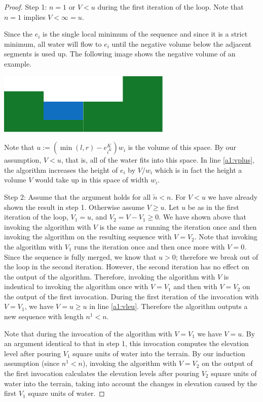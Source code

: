 \documentclass[11pt,a4paper]{article}
\begin{document}
\begin{proof}
Step 1: $n = 1$ or $V < u$ during the first iteration of the loop. Note that $n = 1$ implies $V < \infty = u$.

Since the $e_i$ is the single local minimum of the sequence and since it is a strict minimum, all water will flow to $e_i$ until the negative volume below the adjacent segments is used up.
The following image shows the negative volume of an example.
\begin{center}
  \includegraphics{im6.pdf}
\end{center}
Note that $u := (\min(l, r)-e_{i^K}^K)w_i$ is the volume of this space.
By our assumption, $V < u$, that is, all of the water fits into this space.
In line \ref{a1:vplus}, the algorithm increases the height of $e_i$ by $V/w_i$ which is in fact the height a volume $V$ would take up in this space of width $w_i$.

Step 2: Assume that the argument holds for all $\tilde{n} < n$.
For $V < u$ we have already shown the result in step 1.
Otherwise assume $V \ge u$.
Let $u$ be as in the first iteration of the loop, $V_1 = u$, and $V_2 = V - V_1 \ge 0$.
We have shown above that invoking the algorithm with $V$ is the same as running the iteration once and then invoking the algorithm on the resulting sequence with $V = V_2$.
Note that invoking the algorithm with $V_1$ runs the iteration once and then once more with $V = 0$.
Since the sequence is fully merged, we know that $u > 0$; therefore we break out of the loop in the second iteration.
However, the second iteration has no effect on the output of the algorithm.
Therefore, invoking the algorithm with $V$ is indentical to invoking the algorithm once with $V = V_1$ and then with $V = V_2$ on the output of the first invocation.
During the first iteration of the invocation with $V = V_1$, we have $V = u \ge u$ in line \ref{a1:vleu}.
Therefore the algorithm outputs a new sequence with length $n^1 < n$.

Note that during the invocation of the algorithm with $V = V_1$ we have $V = u$.
By an argument identical to that in step 1, this invocation computes the elevation level after pouring $V_1$ square units of water into the terrain.
By our induction assumption (since $n^1 < n$), invoking the algorithm with $V = V_2$ on the output of the first invocation calculates the elevation levels after pouring $V_2$ square units of water into the terrain, taking into account the changes in elevation caused by the first $V_1$ square units of water.


\end{proof}
\end{document}
